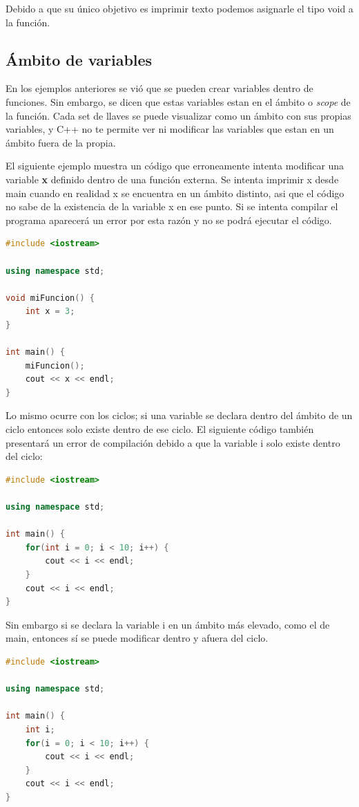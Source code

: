 \documentclass{article}
\begin{document}
Debido a que su único objetivo es imprimir texto podemos asignarle el tipo void a la función.

\subsection{Ámbito de variables}

En los ejemplos anteriores se vió que se pueden crear variables dentro de funciones. Sin embargo, se dicen que estas variables estan en el ámbito o \textit{scope} de la función. Cada set de llaves se puede visualizar como un ámbito con sus propias variables, y C++ no te permite ver ni modificar las variables que estan en un ámbito fuera de la propia.

El siguiente ejemplo muestra un código que erroneamente intenta modificar una variable \textbf{x} definido dentro de una función externa. Se intenta imprimir x desde main cuando en realidad x se encuentra en un ámbito distinto, asi que el código no sabe de la existencia de la variable x en ese punto. Si se intenta compilar el programa aparecerá un error por esta razón y no se podrá ejecutar el código.

\begin{lstlisting}[language=C++, title=Error de ámbito]
#include <iostream>

using namespace std;

void miFuncion() {
	int x = 3;
}

int main() {
	miFuncion();
	cout << x << endl;
}
\end{lstlisting}

Lo mismo ocurre con los ciclos; si una variable se declara dentro del ámbito de un ciclo entonces solo existe dentro de ese ciclo. El siguiente código también presentará un error de compilación debido a que la variable i solo existe dentro del ciclo:

\begin{lstlisting}[language=C++, title=Error de ámbito]
#include <iostream>

using namespace std;

int main() {
	for(int i = 0; i < 10; i++) {
		cout << i << endl;
	}
	cout << i << endl;
}
\end{lstlisting}

Sin embargo si se declara la variable i en un ámbito más elevado, como el de main, entonces sí se puede modificar dentro y afuera del ciclo.

\begin{lstlisting}[language=C++, title=Programa corregido]
#include <iostream>

using namespace std;

int main() {
	int i;
	for(i = 0; i < 10; i++) {
		cout << i << endl;
	}
	cout << i << endl;
}
\end{lstlisting}
\end{document}
